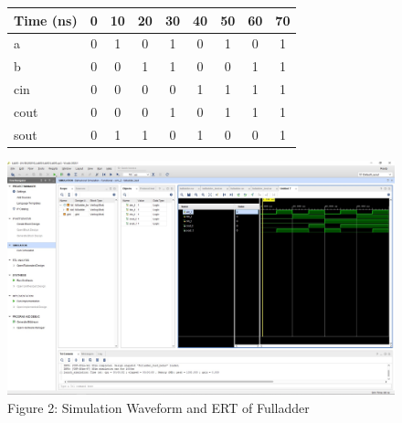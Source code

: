 \documentclass[11pt]{article}
\begin{document}
\begin{figure}[ht]\centering
	\begin{tabular}[ht]{l|cccccccc}
		Time (ns) & 0 & 10 & 20 & 30 & 40 & 50 & 60 & 70 \\
		\midrule
		a & 0 & 1 & 0 & 1 & 0 & 1 & 0 & 1\\
		b & 0 & 0 & 1 & 1 & 0 & 0 & 1 & 1\\
		cin & 0 & 0 & 0 & 0 & 1 & 1 & 1 & 1\\
		\midrule
		cout & 0 & 0 & 0 & 1 & 0 & 1 & 1 & 1\\
		sout & 0 & 1 & 1 & 0 & 1 & 0 & 0 & 1\\
		\bottomrule
	\end{tabular}\medskip
	
	\includegraphics [width=1.0\textwidth,trim=640 600 10 135, clip]{fulladder_pic}
	\caption{Figure 2: Simulation Waveform and ERT of Fulladder}
	\label{fig:sim_with_table}
	
\end{figure}
\end{document}
